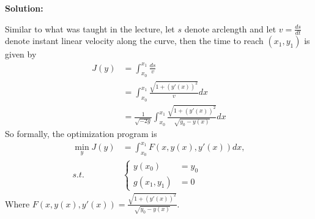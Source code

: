 \documentclass[conference,onecolumn]{IEEEtran}
\begin{document}
\begin{enumerate}
            \textbf{Solution:}

            Similar to what was taught in the lecture, let $s$ denote arclength and let $v = \frac{ds}{dt}$ denote instant linear velocity along the curve, then the time to reach $(x_1, y_1)$ is given by
            \begin{align*}
                  J(y) & = \int_{x_0}^{x_1} \frac{ds}{v}                                                           \\
                       & = \int_{x_0}^{x_1} \frac{\sqrt{1 + (y'(x))^2}}{v} dx                                      \\
                       & = \frac{1}{\sqrt{-2g}} \int_{x_0}^{x_1} \frac{\sqrt{1 + (y'(x))^2}}{\sqrt{y_0 - y(x)}} dx
            \end{align*}
            So formally, the optimization program is
            \begin{align*}
                  \min_y J(y) & = \int_{x_0}^{x_1} F(x, y(x), y'(x)) dx, \\
                  s.t.        & \begin{cases}
                        y(x_0)      & = y_0 \\
                        g(x_1, y_1) & = 0
                  \end{cases}
            \end{align*}
            Where $F(x, y(x), y'(x)) = \frac{\sqrt{1 + (y'(x))^2}}{\sqrt{y_0 - y(x)}}$.


\end{enumerate}
\end{document}
